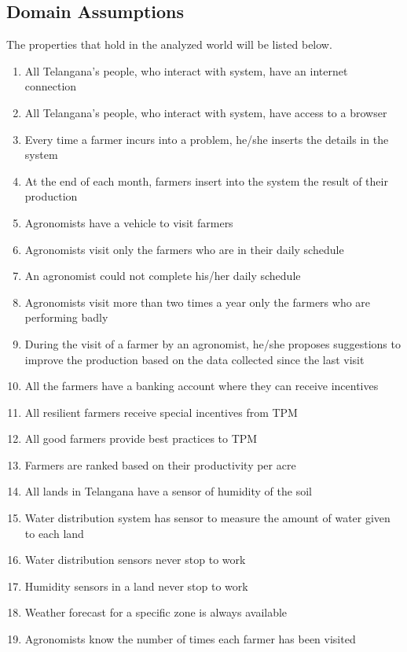 \subsection{Domain Assumptions}
The properties that hold in the analyzed world will be listed below.\\
\begin{enumerate}[label=\textbf{DA.\arabic*}]
    \item All Telangana’s people, who interact with system, have an internet connection
    \item All Telangana’s people, who interact with system, have access to a browser
    \item Every time a farmer incurs into a problem, he/she inserts the details in the system
    \item At the end of each month, farmers insert into the system the result of their production
    \item Agronomists have a vehicle to visit farmers
    \item Agronomists visit only the farmers who are in their daily schedule
    \item An agronomist could not complete his/her daily schedule
    \item Agronomists visit more than two times a year only the farmers who are performing badly
    \item During the visit of a farmer by an agronomist, he/she proposes suggestions to improve the production based on the data collected since the last visit
    \item All the farmers have a banking account where they can receive incentives
    \item All resilient farmers receive special incentives from TPM
    \item All good farmers provide best practices to TPM
    \item Farmers are ranked based on their productivity per acre
    \item All lands in Telangana have a sensor of humidity of the soil
    \item Water distribution system has sensor to measure the amount of water given to each land
    \item Water distribution sensors never stop to work
    \item Humidity sensors in a land never stop to work
    \item Weather forecast for a specific zone is always available
    \item Agronomists know the number of times each farmer has been visited

\end{enumerate}
